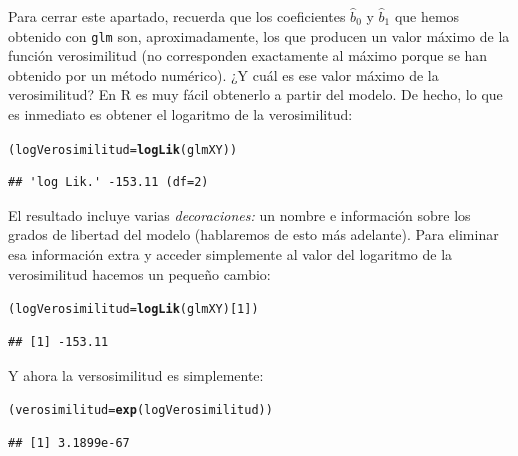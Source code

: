 \documentclass[10pt,a4paper]{article}\usepackage[]{graphicx}\usepackage[]{color}
\makeatletter
\newcommand{\hlnum}[1]{\textcolor[rgb]{0.686,0.059,0.569}{#1}}%
\newcommand{\hlstd}[1]{\textcolor[rgb]{0.345,0.345,0.345}{#1}}%
\newcommand{\hlkwb}[1]{\textcolor[rgb]{0.69,0.353,0.396}{#1}}%
\newcommand{\hlkwd}[1]{\textcolor[rgb]{0.737,0.353,0.396}{\textbf{#1}}}%
\newenvironment{kframe}{%
 \def\at@end@of@kframe{}%
 \ifinner\ifhmode%
  \def\at@end@of@kframe{\end{minipage}}%
  \begin{minipage}{\columnwidth}%
 \fi\fi%
 \def\FrameCommand##1{\hskip\@totalleftmargin \hskip-\fboxsep
 \colorbox{shadecolor}{##1}\hskip-\fboxsep
     \hskip-\linewidth \hskip-\@totalleftmargin \hskip\columnwidth}%
 \MakeFramed {\advance\hsize-\width
   \@totalleftmargin\z@ \linewidth\hsize
   \@setminipage}}%
 {\par\unskip\endMakeFramed%
 \at@end@of@kframe}
\newenvironment{knitrout}{}{} %
\makeatother
\begin{document}
Para cerrar este apartado, recuerda que los coeficientes $\hat b_0$ y $\hat b_1$ que hemos obtenido con {\tt glm} son, aproximadamente, los que producen un valor máximo de la función verosimilitud (no corresponden exactamente al máximo porque se han obtenido por un método numérico). ¿Y cuál es ese valor máximo de la verosimilitud? En R es muy fácil obtenerlo a partir del modelo. De hecho, lo que es inmediato es obtener el logaritmo de la verosimilitud:
\begin{knitrout}
\color{fgcolor}\begin{kframe}
\begin{alltt}
\hlstd{(logVerosimilitud} \hlkwb{=} \hlkwd{logLik}\hlstd{(glmXY))}
\end{alltt}
\begin{verbatim}
## 'log Lik.' -153.11 (df=2)
\end{verbatim}
\end{kframe}
\end{knitrout}
El resultado incluye varias {\em decoraciones:} un nombre e información sobre los grados de libertad del modelo (hablaremos de esto más adelante). Para eliminar esa información extra y acceder simplemente al valor del logaritmo de la verosimilitud hacemos un pequeño cambio:
\begin{knitrout}
\color{fgcolor}\begin{kframe}
\begin{alltt}
\hlstd{(logVerosimilitud} \hlkwb{=} \hlkwd{logLik}\hlstd{(glmXY)[}\hlnum{1}\hlstd{])}
\end{alltt}
\begin{verbatim}
## [1] -153.11
\end{verbatim}
\end{kframe}
\end{knitrout}

Y ahora la versosimilitud es simplemente:
\begin{knitrout}
\color{fgcolor}\begin{kframe}
\begin{alltt}
\hlstd{(verosimilitud} \hlkwb{=} \hlkwd{exp}\hlstd{(logVerosimilitud))}
\end{alltt}
\begin{verbatim}
## [1] 3.1899e-67
\end{verbatim}
\end{kframe}
\end{knitrout}
\end{document}
